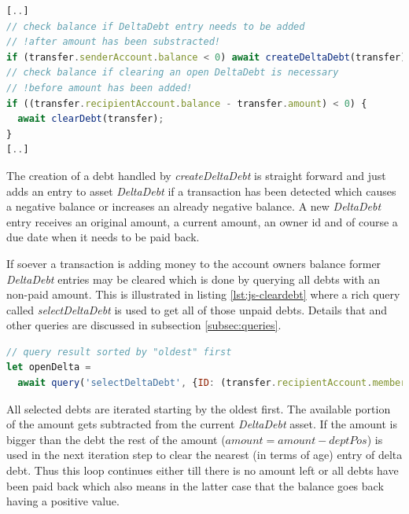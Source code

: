 \begin{center}
\begin{minipage}{0.8\textwidth}
\small
\begin{lstlisting}[language=javascript,firstnumber=1,caption={\bf\small moveMoney JavaScript excerpt}, captionpos=b,label=lst:js-movemoney]
[..]
// check balance if DeltaDebt entry needs to be added
// !after amount has been substracted!
if (transfer.senderAccount.balance < 0) await createDeltaDebt(transfer);
// check balance if clearing an open DeltaDebt is necessary
// !before amount has been added!
if ((transfer.recipientAccount.balance - transfer.amount) < 0) {
  await clearDebt(transfer);
}
[..]
\end{lstlisting}
\end{minipage}
\end{center}

The creation of a debt handled by \textit{createDeltaDebt} is straight forward and just adds an entry to asset \textit{DeltaDebt} if a transaction has been detected which causes a negative balance or increases an already negative balance. A new \textit{DeltaDebt} entry receives an original amount, a current amount, an owner id and of course a due date when it needs to be paid back.

If soever a transaction is adding money to the account owners balance former \textit{DeltaDebt} entries may be cleared which is done by querying all debts with an non-paid amount. This is illustrated in listing \ref{lst:js-cleardebt} where a rich query called \textit{selectDeltaDebt} is used to get all of those unpaid debts. Details that and other queries are discussed in subsection \ref{subsec:queries}.

\begin{center}
\begin{minipage}{0.8\textwidth}
\small
\begin{lstlisting}[language=javascript,firstnumber=1,caption={\bf\small clearDebt JavaScript excerpt}, captionpos=b,label=lst:js-cleardebt]
// query result sorted by "oldest" first
let openDelta =
  await query('selectDeltaDebt', {ID: (transfer.recipientAccount.member.memberID)});
\end{lstlisting}
\end{minipage}
\end{center}

All selected debts are iterated starting by the oldest first. The available portion of the amount gets subtracted from the current \textit{DeltaDebt} asset. If the amount is bigger than the debt the rest of the amount ($amount = amount - deptPos$) is used in the next iteration step to clear the nearest (in terms of age) entry of delta debt. Thus this loop continues either till there is no amount left or all debts have been paid back which also means in the latter case that the balance goes back having a positive value.

